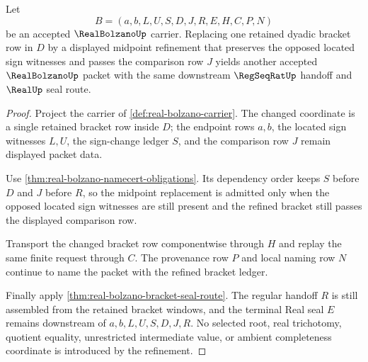 \begin{theorem}
\label{thm:real-bolzano-bracket-refinement-stability}
Let
$$
B=(a,b,L,U,S,D,J,R,E,H,C,P,N)
$$
be an accepted $\RealBolzanoUp$ carrier. Replacing one retained dyadic bracket row in $D$ by a displayed midpoint refinement that preserves the opposed located sign witnesses and passes the comparison row $J$ yields another accepted $\RealBolzanoUp$ packet with the same downstream $\RegSeqRatUp$ handoff and $\RealUp$ seal route.
\end{theorem}
\begin{proof}
Project the carrier of \autoref{def:real-bolzano-carrier}. The changed coordinate is a single retained bracket row inside $D$; the endpoint rows $a,b$, the located sign witnesses $L,U$, the sign-change ledger $S$, and the comparison row $J$ remain displayed packet data.

Use \autoref{thm:real-bolzano-namecert-obligations}. Its dependency order keeps $S$ before $D$ and $J$ before $R$, so the midpoint replacement is admitted only when the opposed located sign witnesses are still present and the refined bracket still passes the displayed comparison row.

Transport the changed bracket row componentwise through $H$ and replay the same finite request through $C$. The provenance row $P$ and local naming row $N$ continue to name the packet with the refined bracket ledger.

Finally apply \autoref{thm:real-bolzano-bracket-seal-route}. The regular handoff $R$ is still assembled from the retained bracket windows, and the terminal Real seal $E$ remains downstream of $a,b,L,U,S,D,J,R$. No selected root, real trichotomy, quotient equality, unrestricted intermediate value, or ambient completeness coordinate is introduced by the refinement.
\end{proof}

